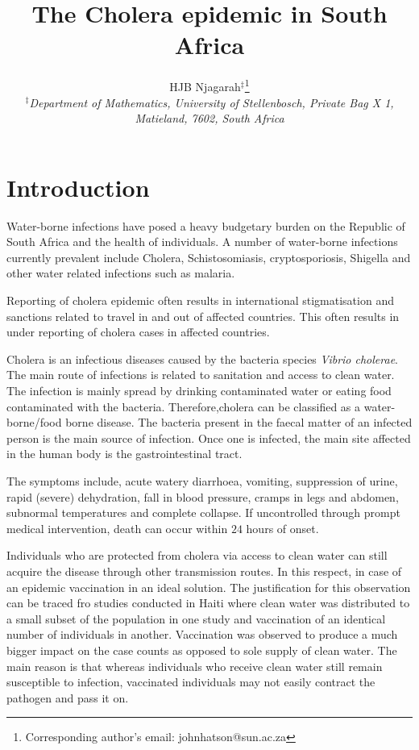 \documentclass[12pt,a4paper]{article}
\author{HJB Njagarah$^{\ddag}$\footnote{Corresponding author's email: johnhatson@sun.ac.za}\\
{\it {\small $^\ddag$Department of Mathematics, University of Stellenbosch, Private Bag X 1, Matieland, 7602, South Africa}}}
\title{The Cholera epidemic in South Africa}
\begin{document}
\maketitle
\section{Introduction}
Water-borne infections have posed a heavy budgetary burden on the Republic of South Africa and the health of individuals. A number of water-borne infections currently prevalent include Cholera, Schistosomiasis, cryptosporiosis, Shigella and other water related infections such as malaria. 


Reporting of cholera epidemic often results in international stigmatisation and sanctions related to travel in and out  of affected countries. This often results in under reporting of cholera cases in affected countries.

Cholera is an infectious diseases caused by the bacteria species \textit{Vibrio cholerae}. The main route of infections is related to sanitation and access to clean water. The infection is mainly spread by drinking contaminated water or eating food contaminated with the bacteria. Therefore,cholera can be classified as a water-borne/food borne disease. The bacteria present in the faecal matter of an infected person is the main source of infection. Once one is infected, the main site affected in the human body is the gastrointestinal tract.   

The symptoms include, acute watery diarrhoea, vomiting, suppression of urine, rapid (severe) dehydration, fall in 
blood pressure, cramps in legs and abdomen, subnormal temperatures and complete collapse. If uncontrolled through 
prompt medical intervention, death can occur within $24$ hours of onset. 

Individuals who are protected from cholera via access to clean water can still acquire the disease through other transmission routes. In this respect, in case of an epidemic vaccination in an ideal solution. The justification for this observation can be traced fro studies conducted in Haiti where clean water was distributed to a small subset of the population in one study and vaccination of an identical number of individuals in another. Vaccination was observed to produce a much bigger impact on the case counts as opposed to sole supply of clean water. The main reason is that whereas individuals who receive clean water still remain susceptible to infection, vaccinated individuals may not easily contract the pathogen and pass it on.  
\end{document}
